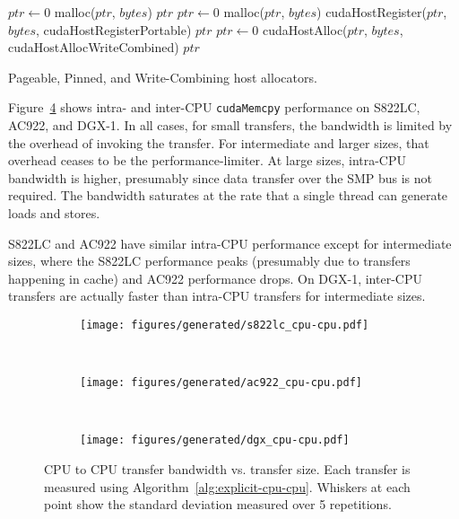 \begin{algorithm}[H]
	\begin{algorithmic}[1]
		\Statex
		\State $ptr \gets 0$
		\State malloc($ptr$, $bytes$)
		\State \Return $ptr$
		\EndFunction
		\Statex
		\State $ptr \gets 0$
		\State malloc($ptr$, $bytes$)
		\State cudaHostRegister($ptr$, $bytes$, cudaHostRegisterPortable)
		\State \Return $ptr$
		\EndFunction
		\Statex
		\State $ptr \gets 0$
		\State cudaHostAlloc($ptr$, $bytes$, cudaHostAllocWriteCombined)
		\State \Return $ptr$
		\EndFunction
		
	\end{algorithmic}
	\caption[Pageable, pinned, and write-combining host allocators]{
        Pageable, Pinned, and Write-Combining host allocators.
	}
	\label{alg:host-allocators}
\end{algorithm}

Figure~\ref{fig:explicit-cpu-cpu} shows intra- and inter-CPU \texttt{cudaMemcpy} performance on S822LC, AC922, and DGX-1.
In all cases, for small transfers, the bandwidth is limited by the overhead of invoking the transfer.
For intermediate and larger sizes, that overhead ceases to be the performance-limiter.
At large sizes, intra-CPU bandwidth is higher, presumably since data transfer over the SMP bus is not required.
The bandwidth saturates at the rate that a single thread can generate loads and stores.

S822LC and AC922 have similar intra-CPU performance except for intermediate sizes, where the S822LC performance peaks (presumably due to transfers happening in cache) and AC922 performance drops.
On DGX-1, inter-CPU transfers are actually faster than intra-CPU transfers for intermediate sizes.

\begin{figure}[H]
	\centering
	\begin{subfigure}[b]{0.31\textwidth}
		\texttt{[image: figures/generated/s822lc\_cpu-cpu.pdf]}
		\caption{}
		\label{fig:s822lc-cpu0-cpu1-dst}
	\end{subfigure}
	~
	\begin{subfigure}[b]{0.31\textwidth}
		\texttt{[image: figures/generated/ac922\_cpu-cpu.pdf]}
		\caption{}
		\label{fig:ac922-cpu0-cpu1-dst}
	\end{subfigure}
	~
	\begin{subfigure}[b]{0.31\textwidth}
		\texttt{[image: figures/generated/dgx\_cpu-cpu.pdf]}
		\caption{}
		\label{fig:dgx-cpu0-cpu1-dst}
	\end{subfigure}
	\caption[CPU to CPU transfer bandwidth]{
		CPU to CPU transfer bandwidth vs. transfer size.
		Each transfer is measured using Algorithm~\ref{alg:explicit-cpu-cpu}.
		Whiskers at each point show the standard deviation measured over 5 repetitions.
	}
	\label{fig:explicit-cpu-cpu}
\end{figure}

